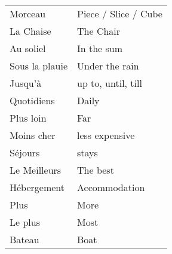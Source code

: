 \begin{longtable}{l  l}
Morceau & Piece / Slice / Cube \\
La Chaise & The Chair \\
Au soliel & In the sum \\
Sous la plauie & Under the rain \\
Jusqu'\`a & up to, until, till \\
Quotidiens & Daily  \\
Plus loin & Far \\
Moins cher & less expensive \\
S\'ejours & stays \\
Le Meilleurs & The best \\
H\'ebergement & Accommodation \\
Plus & More \\
Le plus & Most \\
Bateau & Boat \\
\end{longtable}
